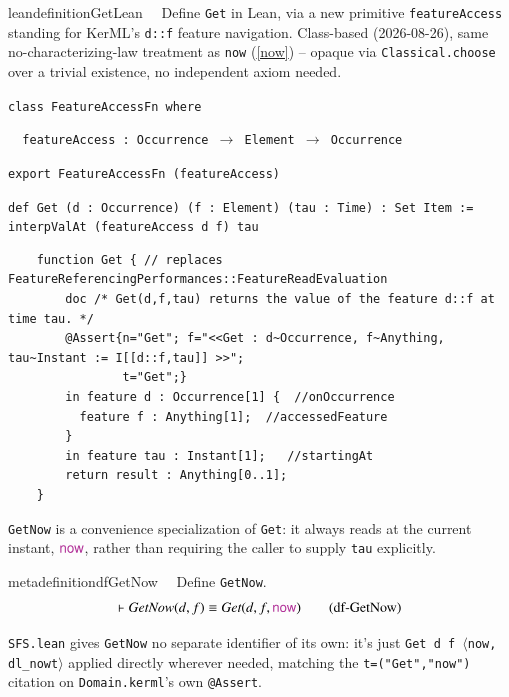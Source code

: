 \begin{restatable}{leandefinition}{GetLean}~~ Define \texttt{Get} in Lean, via a new primitive
\texttt{featureAccess} standing for KerML's \texttt{d::f} feature navigation. Class-based (2026-08-26), same
no-characterizing-law treatment as \texttt{now} (\ref{now}) -- opaque via \texttt{Classical.choose} over a
trivial existence, no independent axiom needed.

\texttt{\textcolor{leancolor}{class} \textcolor{leanyellow}{FeatureAccessFn} \textcolor{leancolor}{where}}

\texttt{~~featureAccess : Occurrence $\to$ Element $\to$ Occurrence}

\texttt{\textcolor{leancolor}{export} FeatureAccessFn (featureAccess)}

\texttt{\textcolor{leancolor}{def} \textcolor{leanyellow}{Get} (d : Occurrence) (f : Element) (tau : Time) : Set Item := interpValAt (featureAccess d f) tau}
\label{Get}
\end{restatable}

\begin{lstlisting}
	function Get { // replaces FeatureReferencingPerformances::FeatureReadEvaluation
		doc /* Get(d,f,tau) returns the value of the feature d::f at time tau. */
		@Assert{n="Get"; f="<<Get : d~Occurrence, f~Anything, tau~Instant := I[[d::f,tau]] >>";
				t="Get";}
		in feature d : Occurrence[1] {  //onOccurrence
		  feature f : Anything[1];  //accessedFeature
		}
		in feature tau : Instant[1];   //startingAt
		return result : Anything[0..1];
	}
\end{lstlisting}

\pn \texttt{GetNow} is a convenience specialization of \texttt{Get}: it always reads at the current instant,
$\mathsf{\mc{now}}$, rather than requiring the caller to supply \texttt{tau} explicitly.

\begin{restatable}{metadefinition}{dfGetNow}~~ Define \texttt{GetNow}.
\begin{align}
\vdash \textit{GetNow}(d,f) \equiv \textit{Get}(d,f,\mathsf{\mc{now}})
\label{eq:df-GetNow}\tag{df-GetNow}
\end{align}
\end{restatable}

\pn \texttt{SFS.lean} gives \texttt{GetNow} no separate identifier of its own: it's just
\texttt{Get d f \textcolor{leancolor}{$\langle$}now, dl\_nowt\textcolor{leancolor}{$\rangle$}} applied
directly wherever needed, matching the \texttt{t=("Get","now")} citation on \texttt{Domain.kerml}'s own
\texttt{@Assert}.

